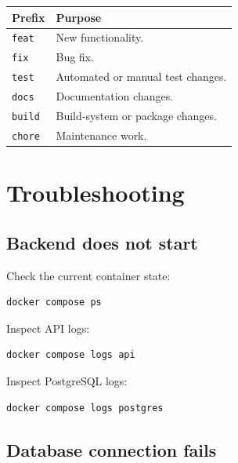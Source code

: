 \documentclass[a4paper,11pt]{article}
\begin{document}
\begin{tabularx}{\linewidth}{@{}p{2.5cm}X@{}}
\toprule
\textbf{Prefix} & \textbf{Purpose} \\
\midrule

\texttt{feat}
  & New functionality. \\

\texttt{fix}
  & Bug fix. \\

\texttt{test}
  & Automated or manual test changes. \\

\texttt{docs}
  & Documentation changes. \\

\texttt{build}
  & Build-system or package changes. \\

\texttt{chore}
  & Maintenance work. \\

\bottomrule
\end{tabularx}

\section{Troubleshooting}

\subsection{Backend does not start}

Check the current container state:

\begin{lstlisting}
docker compose ps
\end{lstlisting}

Inspect API logs:

\begin{lstlisting}
docker compose logs api
\end{lstlisting}

Inspect PostgreSQL logs:

\begin{lstlisting}
docker compose logs postgres
\end{lstlisting}

\subsection{Database connection fails}
\end{document}
